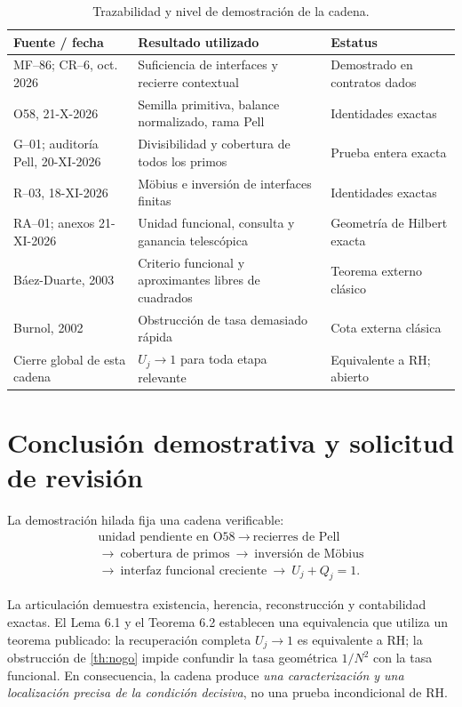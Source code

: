 \documentclass[11pt,a4paper]{article}
\theoremstyle{mine}
\theoremstyle{definition}
\begin{document}
\begin{table}[ht]
\centering\footnotesize
\caption{Trazabilidad y nivel de demostración de la cadena.}
\renewcommand{\arraystretch}{1.15}
\begin{tabularx}{\linewidth}{@{}p{.21\linewidth}X p{.22\linewidth}@{}}\toprule
Fuente / fecha&Resultado utilizado&Estatus\\\midrule
MF--86; CR--6, oct. 2026&Suficiencia de interfaces y recierre contextual&Demostrado en contratos dados\\
O58, 21-X-2026&Semilla primitiva, balance normalizado, rama Pell&Identidades exactas\\
G--01; auditoría Pell, 20-XI-2026&Divisibilidad y cobertura de todos los primos&Prueba entera exacta\\
R--03, 18-XI-2026&Möbius e inversión de interfaces finitas&Identidades exactas\\
RA--01; anexos 21-XI-2026&Unidad funcional, consulta y ganancia telescópica&Geometría de Hilbert exacta\\
Báez-Duarte, 2003&Criterio funcional y aproximantes libres de cuadrados&Teorema externo clásico\\
Burnol, 2002&Obstrucción de tasa demasiado rápida&Cota externa clásica\\
Cierre global de esta cadena&$U_j\to1$ para toda etapa relevante&Equivalente a RH; abierto\\\bottomrule
\end{tabularx}
\end{table}

\section{Conclusión demostrativa y solicitud de revisión}

La demostración hilada fija una cadena verificable:
\[
\boxed{\begin{gathered}
\text{unidad pendiente en O58}\ \longrightarrow\ \text{recierres de Pell}\ \\
\longrightarrow\ \text{cobertura de primos}\ \longrightarrow\ \text{inversión de Möbius}\\
\longrightarrow\ \text{interfaz funcional creciente}\ \longrightarrow\ U_j+Q_j=1.
\end{gathered}}
\]

La articulación demuestra existencia, herencia, reconstrucción y contabilidad exactas. El Lema 6.1 y el Teorema 6.2 establecen una equivalencia que utiliza un teorema publicado: la recuperación completa $U_j\to1$ es equivalente a RH; la obstrucción de \cref{th:nogo} impide confundir la tasa geométrica $1/N^2$ con la tasa funcional. En consecuencia, la cadena produce \emph{una caracterización y una localización precisa de la condición decisiva}, no una prueba incondicional de RH.
\end{document}
